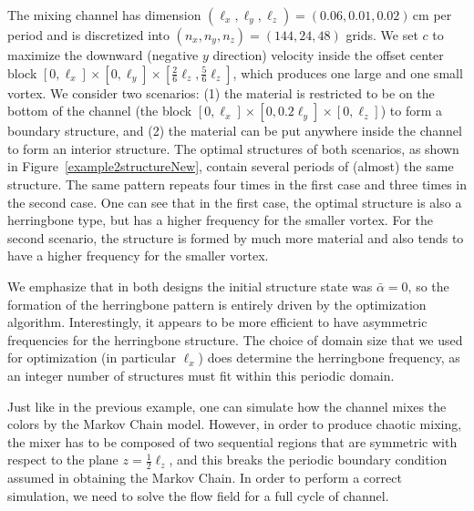 \documentclass[times]{fldauth}
\begin{document}
The mixing channel has dimension $(\ell_x,\ell_y,\ell_z) =
(0.06,0.01,0.02)\,$cm per period and is discretized into
$(n_x,n_y,n_z)=(144,24,48)$ grids. We set $c$ to maximize the downward
(negative $y$ direction) velocity inside the offset center block
$[0,\ell_x]\times[0,\ell_y]\times[\frac{2}{6}\ell_z,\frac{5}{6}\ell_z
]$, which produces one large and one small vortex. We consider two
scenarios: (1) the material is restricted to be on the bottom of the
channel (the block $[0,\ell_x]\times[0,0.2\ell_y]\times[0,\ell_z]$) to
form a boundary structure, and (2) the material can be put anywhere
inside the channel to form an interior structure. The optimal
structures of both scenarios, as shown in
Figure~\ref{example2structureNew}, contain several periods of (almost)
the same structure. The same pattern repeats four times in the first
case and three times in the second case. One can see that in the
first case, the optimal structure is also a herringbone type, but
has a higher frequency for the smaller vortex. For the second
scenario, the structure is formed by much more material and also tends
to have a higher frequency for the smaller vortex.

We emphasize that in both designs the initial structure state was
$\bar{\alpha} = 0$, so the formation of the herringbone pattern is
entirely driven by the optimization algorithm. Interestingly, it
appears to be more efficient to have asymmetric frequencies for the
herringbone structure. The choice of domain size that we used for
optimization (in particular $\ell_x$) does determine the herringbone
frequency, as an integer number of structures must fit within this
periodic domain.

Just like in the previous example, one can simulate how the channel
mixes the colors by the Markov Chain model. However, in order to
produce chaotic mixing, the mixer has to be composed of two sequential
regions that are symmetric with respect to the plane
$z=\frac{1}{2}\ell_z$, and this breaks the periodic boundary condition
assumed in obtaining the Markov Chain. In order to perform a correct
simulation, we need to solve the flow field for a full cycle of
channel.
\end{document}
